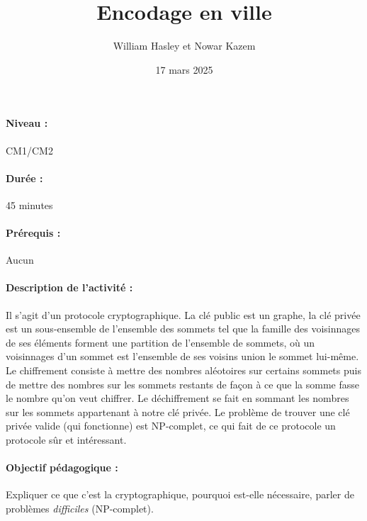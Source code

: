 \documentclass[12pt, a4paper]{article}
\begin{document}
	
	\title{Encodage en ville}
	\author{William Hasley et Nowar Kazem}
	\date{17 mars 2025}
	\maketitle
	
	\paragraph*{Niveau :} CM1/CM2 
	\paragraph*{Durée :} 45 minutes
	\paragraph*{Prérequis :} Aucun
	\paragraph*{Description de l'activité :}
	Il s'agit d'un protocole cryptographique. La clé public est un graphe, la clé privée est un sous-ensemble de l'ensemble des sommets tel que la famille des voisinnages de ses éléments 
	forment une partition de l'ensemble de sommets, où un voisinnages d'un sommet est l'ensemble de ses voisins union le sommet lui-même. Le chiffrement consiste à mettre des nombres aléotoires 
	sur certains sommets puis de mettre des nombres sur les sommets restants de façon à ce que la somme fasse le nombre qu'on veut chiffrer. Le déchiffrement se fait en sommant les nombres sur 
	les sommets appartenant à notre clé privée. Le problème de trouver une clé privée valide (qui fonctionne) est NP-complet, ce qui fait de ce protocole un protocole sûr et intéressant.
	 
	
	\paragraph*{Objectif pédagogique :}
	Expliquer ce que c'est la cryptographique, pourquoi est-elle nécessaire, parler de problèmes \textit{difficiles} (NP-complet).
	
\end{document}
